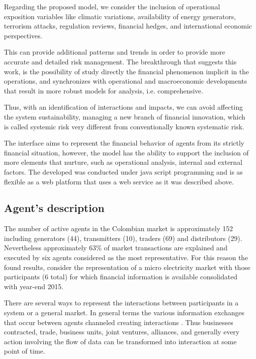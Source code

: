 \documentclass[12pt]{book}
\begin{document}
Regarding the proposed model, we consider the inclusion of operational exposition variables like climatic variations, availability of energy generators, terrorism attacks, regulation reviews, financial hedges, and international economic perspectives. 

This can provide additional patterns and trends in order to provide more accurate and detailed risk management. The breakthrough that suggests this work, is the possibility of study directly the financial phenomenon implicit in the operations, and synchronizes with operational and macroeconomic developments that result in more robust models for analysis, i.e. comprehensive. 

Thus, with an identification of interactions and impacts, we can avoid affecting the system sustainability, managing a new branch of financial innovation, which is called systemic risk very different from conventionally known systematic risk.

The interface aims to represent the financial behavior of agents from its strictly financial situation, however, the model has the ability to support the inclusion of more elements that nurture, such as operational analysis, internal and external factors. The developed was conducted under java script programming and is as flexible as a web platform that uses a web service as it was described above.

\subsection{Agent's description}

The number of active agents in the Colombian market is approximately 152 including generators (44), transmitters (10), traders (69) and distributors (29). Nevertheless approximately 63\% of market transactions are explained and executed by six agents considered as the most representative. For this reason the found results, consider the representation of a micro electricity market with those participants (6 total) for which financial information is available consolidated with year-end 2015.

There are several ways to represent the interactions between participants in a system or a general market. In general terms the various information exchanges that occur between agents channeled creating interactions \cite{tesfatsion2003}. Thus businesses contracted, trade, business units, joint ventures, alliances, and generally every action involving the flow of data can be transformed into interaction at some point of time.
\end{document}
